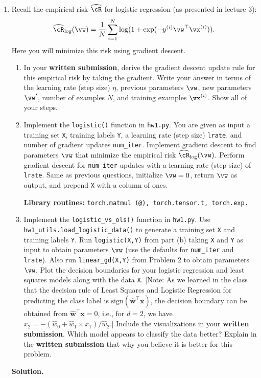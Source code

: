 \documentclass{article}
\def\hcR{\widehat{\cR}}
\theoremstyle{definition}
\theoremstyle{remark}
\newenvironment{Q}
        {%
          \clearpage
          \item
        }
        {%
          \phantom{s} %
          \bigskip
          \textbf{Solution.}
        }
\begin{document}
\begin{enumerate}[font={\Large\bfseries},left=0pt]
\begin{Q}
Recall the empirical risk $\hcR$ for logistic regression (as presented in lecture 3):
\begin{align}
    \hcR_{\log}(\vw) = \frac{1}{N} \sum_{i=1}^N \log ( 1 + \exp( - y^{(i)} \vw^\top \vx^{(i)} ) ).
\end{align}
Here you will minimize this risk using gradient descent.
\begin{enumerate}
% 

\item In your \textbf{written submission}, derive the gradient descent update rule for this empirical risk by taking the gradient. Write your answer in terms of the learning rate (step size) $\eta$, previous parameters $\vw$, new parameters $\vw'$, number of examples $N$, and training examples $\vx^{(i)}$.  Show all of your steps.

\item Implement the \texttt{logistic()} function in \texttt{hw1.py}.  You are given as input a training set \texttt{X}, training labels \texttt{Y}, a learning rate (step size) \texttt{lrate}, and number of gradient updates \texttt{num\_iter}.  Implement gradient descent to find parameters $\vw$ that minimize the empirical risk $\hcR_{\log}(\vw)$. Perform gradient descent for \texttt{num\_iter} updates with a learning rate (step size) of \texttt{lrate}. Same as previous questions, initialize $\vw = 0$, return $\vw$ as output, and prepend \texttt{X} with a column of ones.
          
\textbf{Library routines:} \texttt{torch.matmul (@), torch.tensor.t, torch.exp.}
          
\item Implement the \texttt{logistic\_vs\_ols()} function in \texttt{hw1.py}. Use \texttt{hw1\_utils.load\_logistic\_data()} to generate a training set \texttt{X} and training labels \texttt{Y}.  Run \texttt{logistic(X,Y)} from part (b) taking \texttt{X} and \texttt{Y} as input to obtain parameters $\vw$ (use the defaults for \texttt{num\_iter} and \texttt{lrate}).  Also run \texttt{linear\_gd(X,Y)} from Problem 2 to obtain parameters $\vw$.  Plot the decision boundaries for your logistic regression and least squares models along with the data \texttt{X}. [Note: As we learned in the class that the decision rule of Least Squares and Logistic Regression for predicting the class label is $\mbox{sign}(\hat{\bm w}^\top \bm x)$, the decision boundary can be obtained from $\hat{\bm w}^\top \bm x=0$, i.e., for $d=2$, we have $x_2=-(\hat w_0+\hat w_1\times x_1)/\hat w_2$.] Include the visualizations in your \textbf{written submission}. Which model appears to classify the data better? Explain in the \textbf{written submission} that why you believe it is better for this problem. 
          

\end{enumerate}
\end{Q}
\end{enumerate}
\end{document}
